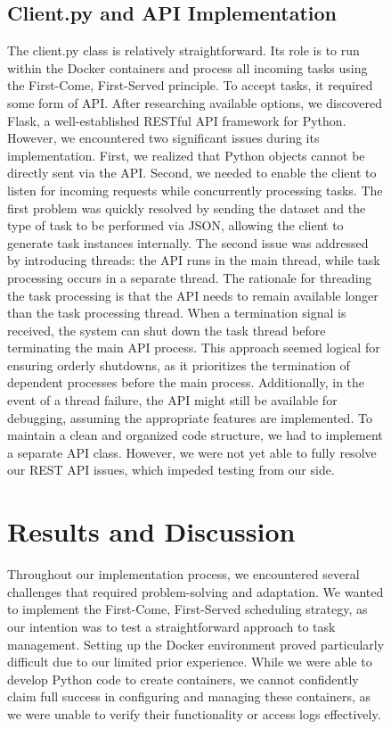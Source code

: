 \documentclass{article}
\begin{document}
\begin{figure}[h!]
\subsection{Client.py and API Implementation}
The client.py class is relatively straightforward. Its role is to run within the Docker containers and process all incoming tasks using the First-Come, First-Served principle. To accept tasks, it required some form of API. After researching available options, we discovered Flask, a well-established RESTful API framework for Python.
However, we encountered two significant issues during its implementation. First, we realized that Python objects cannot be directly sent via the API. Second, we needed to enable the client to listen for incoming requests while concurrently processing tasks. The first problem was quickly resolved by sending the dataset and the type of task to be performed via JSON, allowing the client to generate task instances internally. The second issue was addressed by introducing threads: the API runs in the main thread, while task processing occurs in a separate thread. The rationale for threading the task processing is that the API needs to remain available longer than the task processing thread. When a termination signal is received, the system can shut down the task thread before terminating the main API process. This approach seemed logical for ensuring orderly shutdowns, as it prioritizes the termination of dependent processes before the main process. Additionally, in the event of a thread failure, the API might still be available for debugging, assuming the appropriate features are implemented. To maintain a clean and organized code structure, we had to implement a separate API class. However, we were not yet able to fully resolve our REST API issues, which impeded testing from our side.

\section{Results and Discussion}
Throughout our implementation process, we encountered several challenges that required problem-solving and adaptation. We wanted to implement the First-Come, First-Served scheduling strategy, as our intention was to test a straightforward approach to task management. Setting up the Docker environment proved particularly difficult due to our limited prior experience. While we were able to develop Python code to create containers, we cannot confidently claim full success in configuring and managing these containers, as we were unable to verify their functionality or access logs effectively.


\end{figure}
\end{document}
